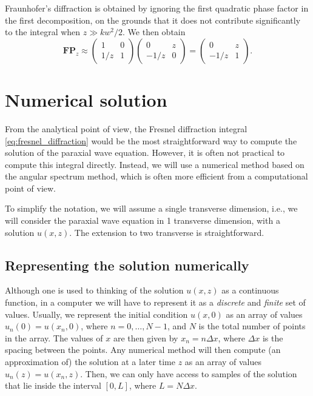 \documentclass[a4paper,10pt]{report}
\begin{document}
Fraunhofer's diffraction is obtained by ignoring the first quadratic phase factor in the first decomposition, on the grounds that it does not contribute significantly to the integral when $z \gg kw^2/2$. We then obtain
\begin{equation}
    \mathbf{FP}_z \approx \begin{pmatrix}
        1 & 0 \\
        1/z & 1
    \end{pmatrix} \begin{pmatrix}
        0 & z \\
        -1/z & 0
    \end{pmatrix} = \begin{pmatrix}
        0 & z \\
        -1/z & 1
    \end{pmatrix} .
\end{equation}

\chapter{Numerical solution}

From the analytical point of view, the Fresnel diffraction integral \eqref{eq:fresnel_diffraction} would be the most straightforward way to compute the solution of the paraxial wave equation. However, it is often not practical to compute this integral directly. Instead, we will use a numerical method based on the angular spectrum method, which is often more efficient from a computational point of view.

To simplify the notation, we will assume a single transverse dimension, i.e., we will consider the paraxial wave equation in 1 transverse dimension, with a solution $u(x,z)$. The extension to two transverse  is straightforward.

\section{Representing the solution numerically}

Although one is used to thinking of the solution $u(x,z)$ as a continuous function, in a computer we will have to represent it as a \textit{discrete} and \textit{finite} set of values. Usually, we represent the initial condition $u(x,0)$ as an array of values $u_n(0) = u(x_n, 0)$, where $n = 0, \ldots, N-1$, and $N$ is the total number of points in the array. The values of $x$ are then given by $x_n = n \Delta x$, where $\Delta x$ is the spacing between the points. Any numerical method will then compute (an approximation of) the solution at a later time $z$ as an array of values $u_n(z) = u(x_n, z)$. Then, we can only have access to samples of the solution that lie inside the interval $[0, L]$, where $L = N \Delta x$.
\end{document}
